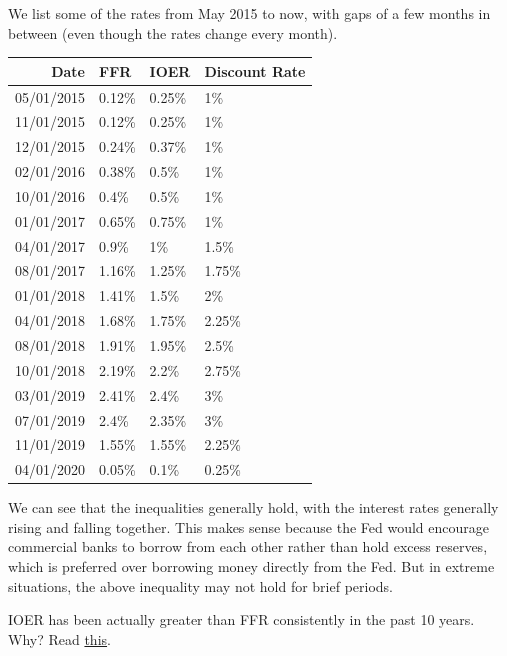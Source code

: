 \documentclass{article}
\begin{document}
    \begin{example}
      We list some of the rates from May 2015 to now, with gaps of a few months in between (even though the rates change every month). 
      \begin{center}
      \begin{tabular}{r|l|l|l}
        Date & FFR& IOER & Discount Rate\\
        \hline
        05/01/2015 & 0.12\% & 0.25\% & 1\% \\
        11/01/2015 & 0.12\% & 0.25\% & 1\% \\
        12/01/2015 & 0.24\% & 0.37\% & 1\% \\
        02/01/2016 & 0.38\% & 0.5\% & 1\% \\
        10/01/2016 & 0.4\% & 0.5\% & 1\% \\
        01/01/2017 & 0.65\% & 0.75\% & 1\% \\
        04/01/2017 & 0.9\% & 1\% & 1.5\% \\
        08/01/2017 & 1.16\% & 1.25\% & 1.75\% \\
        01/01/2018 & 1.41\% & 1.5\% & 2\% \\
        04/01/2018 & 1.68\% & 1.75\% & 2.25\% \\
        08/01/2018 & 1.91\% & 1.95\% & 2.5\% \\
        10/01/2018 & 2.19\% & 2.2\% & 2.75\% \\
        03/01/2019 & 2.41\% & 2.4\% & 3\% \\
        07/01/2019 & 2.4\% & 2.35\% & 3\% \\
        11/01/2019 & 1.55\% & 1.55\% & 2.25\% \\
        04/01/2020 & 0.05\% & 0.1\% & 0.25\% 
      \end{tabular}
      \end{center}
      We can see that the inequalities generally hold, with the interest rates generally rising and falling together. This makes sense because the Fed would encourage commercial banks to borrow from each other rather than hold excess reserves, which is preferred over borrowing money directly from the Fed. But in extreme situations, the above inequality may not hold for brief periods. 
    \end{example}

    \begin{question}
      IOER has been actually greater than FFR consistently in the past 10 years. Why? Read \href{https://www.clevelandfed.org/publications/economic-commentary/2017/ec-201707-the-federal-funds-market-since-the-financial-crisis}{this}. 
    \end{question}
\end{document}

